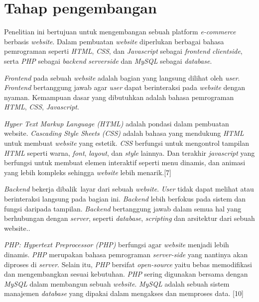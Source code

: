\section{Tahap pengembangan}
Penelitian ini bertujuan untuk mengembangan sebuah platform \textit{e-commerce} berbasis \textit{website}. Dalam pembuatan \textit{website} diperlukan berbagai bahasa pemrograman seperti \textit{HTML}, \textit{CSS}, dan \textit{Javascript} sebagai \textit{frontend} \textit{clientside}, serta \textit{PHP} sebagai \textit{backend} \textit{serverside} dan \textit{MySQL} sebagai \textit{database}.
\par \textit{Frontend} pada sebuah \textit{website} adalah bagian yang langsung dilihat oleh \textit{user}. \textit{Frontend} bertanggung jawab agar \textit{user} dapat berinteraksi pada \textit{website} dengan nyaman. Kemampuan dasar yang dibutuhkan adalah bahasa pemrograman \textit{HTML}, \textit{CSS}, \textit{Javascript}.
\par \textit{Hyper Text Markup Language (HTML)} adalah pondasi dalam pembuatan website. \textit{Cascading Style Sheets (CSS)} adalah bahasa yang mendukung \textit{HTML} untuk membuat \textit{website} yang estetik. \textit{CSS} berfungsi untuk mengontrol tampilan \textit{HTML} seperti warna, \textit{font}, \textit{layout}, dan \textit{style} lainnya. Dan terakhir \textit{javascript} yang berfungsi untuk membuat elemen interaktif seperti menu dinamis, dan animasi yang lebih kompleks sehingga \textit{website} lebih menarik.[7]
\par \textit{Backend} bekerja dibalik layar dari sebuah \textit{website}. \textit{User} tidak dapat melihat atau berinteraksi langsung pada bagian ini. \textit{Backend} lebih berfokus pada sistem dan fungsi daripada tampilan. \textit{Backend} bertanggung jawab dalam semua hal yang berhubungan dengan \textit{server}, seperti \textit{database}, \textit{scripting} dan arsitektur dari sebuah website.. 
\par \textit{PHP: Hypertext Preprocessor (PHP)} berfungsi agar \textit{website} menjadi lebih dinamis. \textit{PHP} merupakan bahasa pemrograman \textit{server-side} yang nantinya akan diproses di \textit{server}. Selain itu, \textit{PHP} bersifat \textit{open-source} yaitu bebas memodifikasi dan mengembangkan sesuai kebutuhan. \textit{PHP} sering digunakan bersama dengan \textit{MySQL} dalam membangun sebuah \textit{website}. \textit{MySQL} adalah sebuah sistem manajemen \textit{database} yang dipakai dalam mengakses dan memproses data. [10]